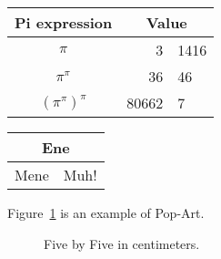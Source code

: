 \documentclass{article}
\begin{document}
\newline
\newline
\newline
\begin{tabular}{c r @{.} l}
Pi expression & \multicolumn{2}{c}{Value} \\
\hline
$\pi$ & 3&1416 \\
$\pi^{\pi}$ & 36&46 \\
$(\pi^{\pi})^{\pi}$ & 80662&7 \\
\end{tabular}
\newline
\newline
\newline
\begin{tabular}{|c|c|}
\hline
\multicolumn{2}{|c|}{Ene} \\
\hline
Mene & Muh! \\
\hline
\end{tabular}
\newline
\newline
\newline
\clearpage
Figure~\ref{white} is an example of Pop-Art.
\begin{figure}[!hbtp]
\makebox[\textwidth]{\framebox[5cm]{\rule{Opt}{5cm}}}
\caption{Five by Five in centimeters.\label{white}}
\end{figure}
\end{document}
